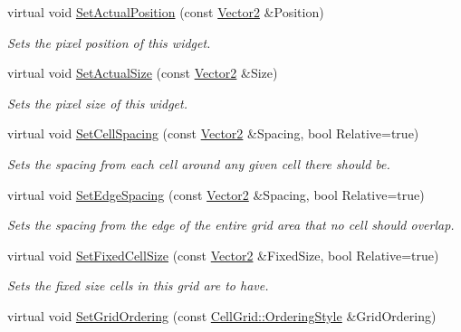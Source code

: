 \begin{DoxyCompactItemize}
virtual void \hyperlink{classMezzanine_1_1UI_1_1CellGrid_aec72d4eae4497e7ffa62f7697d4dc468}{SetActualPosition} (const \hyperlink{classMezzanine_1_1Vector2}{Vector2} \&Position)
\begin{DoxyCompactList}\small\item\em Sets the pixel position of this widget. \item\end{DoxyCompactList}\item 
virtual void \hyperlink{classMezzanine_1_1UI_1_1CellGrid_a2ab8b9b913aaac889ea76e565eccdbc6}{SetActualSize} (const \hyperlink{classMezzanine_1_1Vector2}{Vector2} \&Size)
\begin{DoxyCompactList}\small\item\em Sets the pixel size of this widget. \item\end{DoxyCompactList}\item 
virtual void \hyperlink{classMezzanine_1_1UI_1_1CellGrid_a02fe0c290a43950565fc5b9dc4285212}{SetCellSpacing} (const \hyperlink{classMezzanine_1_1Vector2}{Vector2} \&Spacing, bool Relative=true)
\begin{DoxyCompactList}\small\item\em Sets the spacing from each cell around any given cell there should be. \item\end{DoxyCompactList}\item 
virtual void \hyperlink{classMezzanine_1_1UI_1_1CellGrid_a9b086636cf3b6830db5948a24380ee1a}{SetEdgeSpacing} (const \hyperlink{classMezzanine_1_1Vector2}{Vector2} \&Spacing, bool Relative=true)
\begin{DoxyCompactList}\small\item\em Sets the spacing from the edge of the entire grid area that no cell should overlap. \item\end{DoxyCompactList}\item 
virtual void \hyperlink{classMezzanine_1_1UI_1_1CellGrid_aae3aa4503b5673470a83dd9edd445e77}{SetFixedCellSize} (const \hyperlink{classMezzanine_1_1Vector2}{Vector2} \&FixedSize, bool Relative=true)
\begin{DoxyCompactList}\small\item\em Sets the fixed size cells in this grid are to have. \item\end{DoxyCompactList}\item 
virtual void \hyperlink{classMezzanine_1_1UI_1_1CellGrid_a6f5768054e49b85d47eba5df6e9b28a9}{SetGridOrdering} (const \hyperlink{classMezzanine_1_1UI_1_1CellGrid_ab054f3bbb294e4a584b8ab63b4d3f237}{CellGrid::OrderingStyle} \&GridOrdering)

\end{DoxyCompactItemize}
